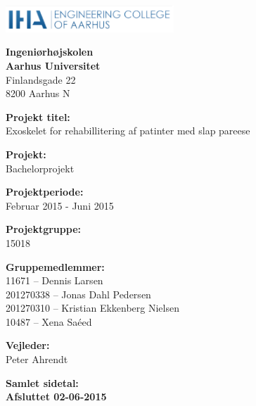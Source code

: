 \newpage

{}


\begin{minipage}[t]{0.48\textwidth}
\vspace*{14pt}			%
\vspace{1.2cm}
\includegraphics[height=1cm]{Pictures/iha-logo.png} 
\end{minipage}
\hfill

\vspace*{1cm}

\begin{minipage}[t]{1\textwidth}

{\small 
\flushleft
\textbf{Ingeniørhøjskolen}\\
\textbf{Aarhus Universitet}  \\
Finlandsgade 22 \\
8200 Aarhus N \\
}

\vspace*{1cm}

\textbf{Projekt titel:} \\[5pt]\bigskip\hspace{2ex}
Exoskelet for rehabillitering af patinter med slap pareese 

\textbf{Projekt:} \\[5pt]\bigskip\hspace{2ex}
Bachelorprojekt

\textbf{Projektperiode:} \\[5pt]\bigskip\hspace{2ex}
Februar 2015 - Juni 2015

\textbf{Projektgruppe:} \\[5pt]\bigskip\hspace{2ex}
15018

\textbf{Gruppemedlemmer:} \\[5pt]\hspace*{2ex}
11671 	  -- Dennis Larsen \\\hspace*{2ex}
201270338 -- Jonas Dahl Pedersen \\\hspace*{2ex}
201270310 -- Kristian Ekkenberg Nielsen \\\hspace*{2ex}
10487 	  -- Xena Saéed \\\bigskip\hspace*{2ex}



\textbf{Vejleder:} \\[5pt]\hspace*{2ex}
Peter Ahrendt \\\bigskip\hspace{2ex}

\vspace*{1cm}

\textbf{Samlet sidetal: \pageref{LastPage}} \\
\textbf{Afsluttet 02-06-2015}


\end{minipage}
\hfill
\vfill

